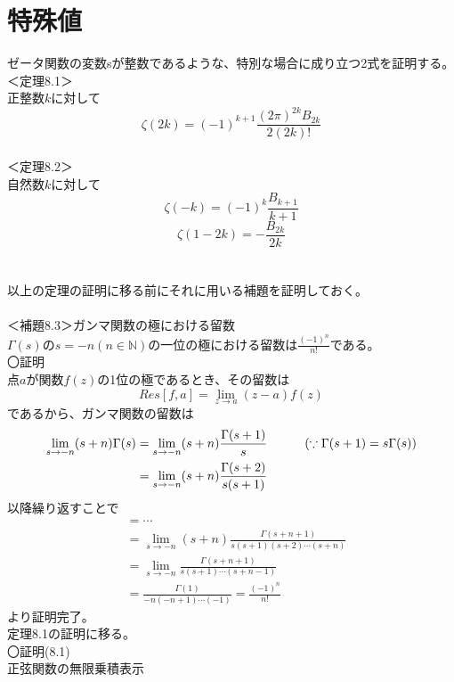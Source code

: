 \documentclass{jsarticle}
\begin{document}
\section{特殊値}
ゼータ関数の変数sが整数であるような、特別な場合に成り立つ2式を証明する。\\
＜定理8.1＞\\
正整数\(k\)に対して
\begin{equation}
\zeta(2k)=(-1)^{k+1}\frac{(2\pi)^{2k}B_{2k}}{2(2k)!}
\end{equation}
\\
＜定理8.2＞\\
自然数\(k\)に対して
\begin{equation}
\zeta(-k)=(-1)^{k}\frac{B_{k+1}}{k+1}
\end{equation}
\begin{equation}
\zeta(1-2k)=-\frac{B_{2k}}{2k}
\end{equation}
\\
\\
以上の定理の証明に移る前にそれに用いる補題を証明しておく。\\
\\
＜補題8.3＞ガンマ関数の極における留数\\
\(\Gamma(s)\)の\(s=-n(n\in\mathbb{N})\)の一位の極における留数は\(\displaystyle\frac{(-1)^{n}}{n!}\)である。\\
〇証明\\
点\(a\)が関数\(f(z)\)の1位の極であるとき、その留数は
\[Res[f,a]=\lim_{z\to a}(z-a)f(z)\]
であるから、ガンマ関数の留数は
\begin{align*}
\lim_{s\to-n}(s+n)\Gamma(s)&=\lim_{s\to-n}(s+n)\frac{\Gamma(s+1)}{s}\hspace{10mm}\left(\because\Gamma(s+1)=s\Gamma(s)\right)\\
&=\lim_{s\to-n}(s+n)\frac{\Gamma(s+2)}{s(s+1)}\\
\end{align*}
以降繰り返すことで
\begin{align*}
&=\cdots\\
&=\lim_{s\to-n}(s+n)\frac{\Gamma(s+n+1)}{s(s+1)(s+2)\cdots(s+n)}\\
&=\lim_{s\to-n}\frac{\Gamma(s+n+1)}{s(s+1)\cdots(s+n-1)}\\
&=\frac{\Gamma(1)}{-n(-n+1)\cdots(-1)}=\frac{(-1)^{n}}{n!}
\end{align*}
より証明完了。\\
定理8.1の証明に移る。\\
〇証明(8.1)\\
正弦関数の無限乗積表示
\end{document}
